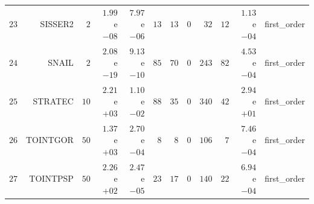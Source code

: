 \begin{longtable}{rrrrrrrrrrrr}
  \(    23\) & SISSER2 & \(     2\) & \( 1.99\)e\(-08\) & \( 7.97\)e\(-06\) & \(    13\) & \(    13\) & \(     0\) & \(    32\) & \(    12\) & \( 1.13\)e\(-04\) & first\_order \\
  \(    24\) & SNAIL & \(     2\) & \( 2.08\)e\(-19\) & \( 9.13\)e\(-10\) & \(    85\) & \(    70\) & \(     0\) & \(   243\) & \(    82\) & \( 4.53\)e\(-04\) & first\_order \\
  \(    25\) & STRATEC & \(    10\) & \( 2.21\)e\(+03\) & \( 1.10\)e\(-02\) & \(    88\) & \(    35\) & \(     0\) & \(   340\) & \(    42\) & \( 2.94\)e\(+01\) & first\_order \\
  \(    26\) & TOINTGOR & \(    50\) & \( 1.37\)e\(+03\) & \( 2.70\)e\(-04\) & \(     8\) & \(     8\) & \(     0\) & \(   106\) & \(     7\) & \( 7.46\)e\(-04\) & first\_order \\
  \(    27\) & TOINTPSP & \(    50\) & \( 2.26\)e\(+02\) & \( 2.47\)e\(-05\) & \(    23\) & \(    17\) & \(     0\) & \(   140\) & \(    22\) & \( 6.94\)e\(-04\) & first\_order \\\hline
\end{longtable}
